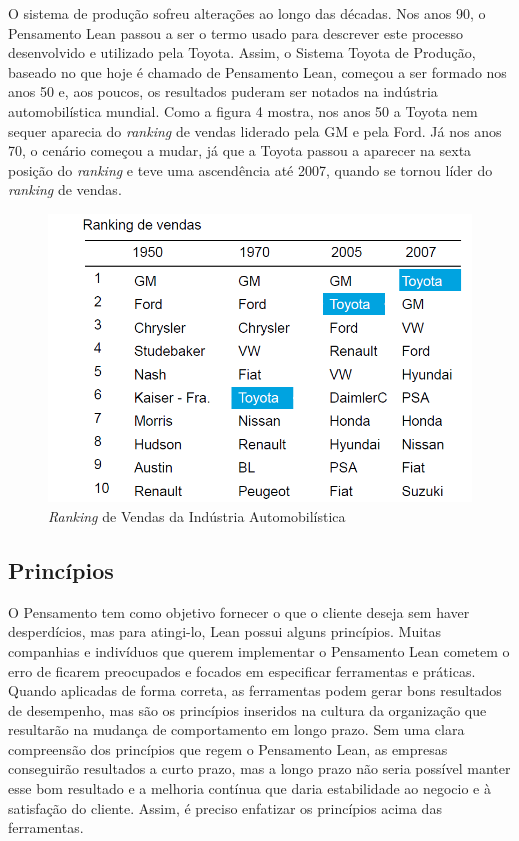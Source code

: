 O sistema de produção sofreu alterações ao longo das décadas. Nos anos 90, o Pensamento Lean passou a ser o termo usado para descrever este processo desenvolvido e utilizado pela Toyota. Assim, o Sistema Toyota de Produção, baseado no que hoje é chamado de Pensamento Lean, começou a ser formado nos anos 50 e, aos poucos, os resultados puderam ser notados na indústria automobilística mundial. Como a figura 4 mostra, nos anos 50 a Toyota nem sequer aparecia do \textit{ranking} de vendas liderado pela GM e pela Ford. Já nos anos 70, o cenário começou a mudar, já que a Toyota passou a aparecer na sexta posição do \textit{ranking} e teve uma ascendência até 2007, quando se tornou líder do \textit{ranking} de vendas.

\begin{figure}[H]
		\centering
		\label{fig01}
			\includegraphics[scale=0.5]{figuras/ranking.png}
		\caption{\textit{Ranking} de Vendas da Indústria Automobilística  \cite{ranking}}
\end{figure}

\subsection[Princípios]{Princípios}

O Pensamento tem como objetivo fornecer o que o cliente deseja sem haver desperdícios, mas para atingi-lo, Lean possui alguns princípios. Muitas companhias e indivíduos que querem implementar o Pensamento Lean cometem o erro de ficarem preocupados e focados em especificar ferramentas e práticas. Quando aplicadas de forma correta, as ferramentas podem gerar bons resultados de desempenho, mas são os princípios inseridos na cultura da organização que resultarão na mudança de comportamento em longo prazo. Sem uma clara compreensão dos princípios que regem o Pensamento Lean, as empresas conseguirão resultados a curto prazo, mas a longo prazo não seria possível manter esse bom resultado e a melhoria contínua que daria estabilidade ao negocio e à satisfação do cliente. Assim, é preciso enfatizar os princípios acima das ferramentas. 

